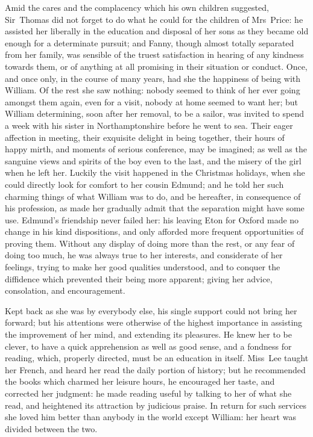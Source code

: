 Amid the cares and the complacency which his own children suggested, Sir~Thomas did not forget to do what he could for the children of Mrs~Price: he assisted her liberally in the education and disposal of her sons as they became old enough for a determinate pursuit; and Fanny, though almost totally separated from her family, was sensible of the truest satisfaction in hearing of any kindness towards them, or of anything at all promising in their situation or conduct. Once, and once only, in the course of many years, had she the happiness of being with William. Of the rest she saw nothing: nobody seemed to think of her ever going amongst them again, even for a visit, nobody at home seemed to want her; but William determining, soon after her removal, to be a sailor, was invited to spend a week with his sister in Northamptonshire before he went to sea. Their eager affection in meeting, their exquisite delight in being together, their hours of happy mirth, and moments of serious conference, may be imagined; as well as the sanguine views and spirits of the boy even to the last, and the misery of the girl when he left her. Luckily the visit happened in the Christmas holidays, when she could directly look for comfort to her cousin Edmund; and he told her such charming things of what William was to do, and be hereafter, in consequence of his profession, as made her gradually admit that the separation might have some use. Edmund's friendship never failed her: his leaving Eton for Oxford made no change in his kind dispositions, and only afforded more frequent opportunities of proving them. Without any display of doing more than the rest, or any fear of doing too much, he was always true to her interests, and considerate of her feelings, trying to make her good qualities understood, and to conquer the diffidence which prevented their being more apparent; giving her advice, consolation, and encouragement.

Kept back as she was by everybody else, his single support could not bring her forward; but his attentions were otherwise of the highest importance in assisting the improvement of her mind, and extending its pleasures. He knew her to be clever, to have a quick apprehension as well as good sense, and a fondness for reading, which, properly directed, must be an education in itself. Miss~Lee taught her French, and heard her read the daily portion of history; but he recommended the books which charmed her leisure hours, he encouraged her taste, and corrected her judgment: he made reading useful by talking to her of what she read, and heightened its attraction by judicious praise. In return for such services she loved him better than anybody in the world except William: her heart was divided between the two. 